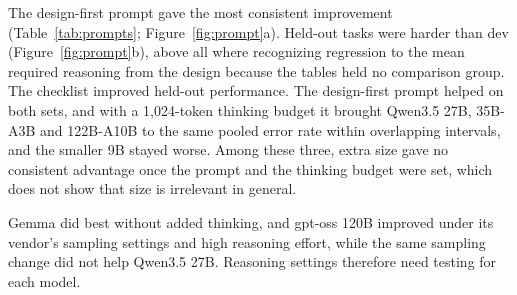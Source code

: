 The design-first prompt gave the most consistent improvement (Table~\ref{tab:prompts}; Figure~\ref{fig:prompt}a). Held-out tasks were harder than dev (Figure~\ref{fig:prompt}b), above all where recognizing regression to the mean required reasoning from the design because the tables held no comparison group. The checklist improved held-out performance. The design-first prompt helped on both sets, and with a 1,024-token thinking budget it brought Qwen3.5 27B, 35B-A3B and 122B-A10B to the same pooled error rate within overlapping intervals, and the smaller 9B stayed worse. Among these three, extra size gave no consistent advantage once the prompt and the thinking budget were set, which does not show that size is irrelevant in general.

Gemma did best without added thinking, and gpt-oss 120B improved under its vendor's sampling settings and high reasoning effort, while the same sampling change did not help Qwen3.5 27B. Reasoning settings therefore need testing for each model.

